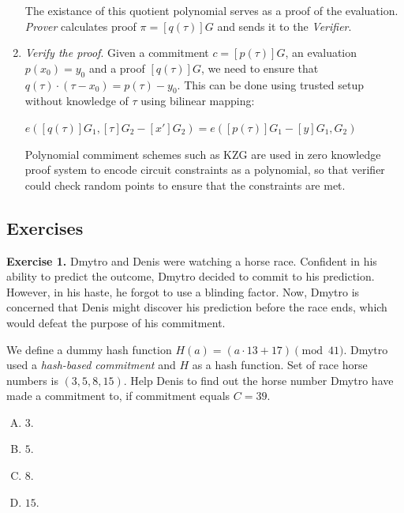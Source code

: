 \documentclass[../lecture-notes.tex]{subfiles}
\begin{document}
\begin{enumerate}[left=0mm]
    The existance of this quotient polynomial serves
    as a proof of the evaluation. \textit{Prover} calculates proof $\pi = [q(\tau)]G$ and sends it to the \textit{Verifier}.

    \item \textit{Verify the proof}. Given a commitment $c = [p(\tau)]G$, an evaluation $p(x_0) = y_0$ and a proof $[q(\tau)]G$, we need to
    ensure that $q(\tau) \cdot (\tau - x_0) = p(\tau) - y_0$. This can be done using trusted setup without knowledge of $\tau$ using bilinear mapping:

    \begin{center}
        $e([q(\tau)]G_1, [\tau]G_2 - [x']G_2) = e([p(\tau)]G_1 - [y]G_1, G_2)$
    \end{center}
    
    Polynomial commiment schemes such as KZG are used in zero knowledge proof system to encode circuit constraints as a polynomial, 
    so that verifier could check random points to ensure that the constraints are met.

\end{enumerate}

\subsection{Exercises}

\textbf{Exercise 1.} Dmytro and Denis were watching a horse race. 
    Confident in his ability to predict the outcome, Dmytro decided to commit to his prediction. 
    However, in his haste, he forgot to use a blinding factor. 
    Now, Dmytro is concerned that Denis might discover his prediction before the race ends, 
    which would defeat the purpose of his commitment.
    
    We define a dummy hash function $H(a) = (a \cdot 13 + 17) \pmod{41}$.
    Dmytro used a \textit{hash-based commitment} and $H$ as a hash function. 
    Set of race horse numbers is $(3, 5, 8, 15)$.
    Help Denis to find out the horse number Dmytro have made a commitment to, 
    if commitment equals $C = 39$.

\begin{enumerate}[(A)]
    \item $3$.
    \item $5$.
    \item $8$.
    \item $15$.
\end{enumerate}
\end{document}
